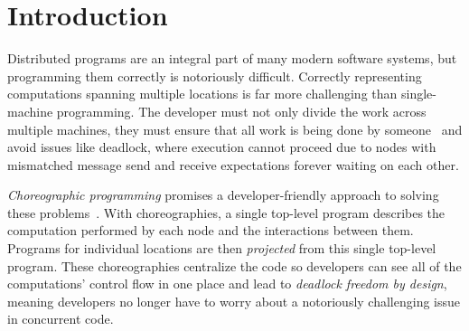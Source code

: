 \section{Introduction}
\label{sec:introduction}

Distributed programs are an integral part of many modern software systems, but programming them correctly is notoriously difficult.
Correctly representing computations spanning multiple locations is far more challenging than single-machine programming.
The developer must not only divide the work across multiple machines, they must ensure that all work is being done by someone~
and avoid issues like deadlock, where execution cannot proceed due to nodes with mismatched message send and receive expectations forever waiting on each other.


\emph{Choreographic programming} promises a developer-friendly approach to solving these problems~\citep{Montesi22,Montesi13}.
With choreographies, a single top-level program describes the computation performed by each node and the interactions between them.
Programs for individual locations are then \emph{projected} from this single top-level program.
These choreographies centralize the code so developers can see all of the computations' control flow in one place
and lead to \emph{deadlock freedom by design}, meaning developers no longer have to worry about a notoriously challenging issue in concurrent code.


